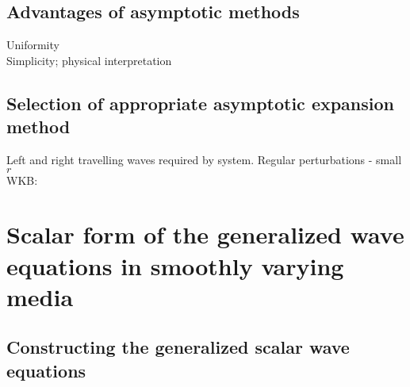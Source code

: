 \documentclass[twocolumn,secnumarabic,amssymb, nobibnotes, aps, prd]{revtex4-1}
\begin{document}

\subsection{Advantages of asymptotic methods}
Uniformity\\
Simplicity; physical interpretation

\subsection{Selection of appropriate asymptotic expansion method}
Left and right travelling waves required by system. Regular perturbations - small $r$\\
WKB: 



\section{Scalar form of the generalized wave equations in smoothly varying media}
\subsection{Constructing the generalized scalar wave equations}
\end{document}
